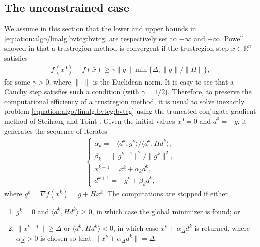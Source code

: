 \documentclass[letterpaper,10pt,english]{sphinxmanual}
\newcommand{\norm}[2][]{#1\lVert#2#1\rVert}
\newcommand{\set}[2][]{#1\{#2#1\}}
\newcommand{\inner}[2][]{#1\langle#2#1\rangle}
\def\R{\ensuremath{\mathds{R}}}
\begin{document}
\subsection{The unconstrained case}
\label{\detokenize{algo/linalg.bvtcg:the-unconstrained-case}}\label{\detokenize{algo/linalg.bvtcg:tcg-base}}
\sphinxAtStartPar
We assume in this section that the lower and upper bounds in \eqref{equation:algo/linalg.bvtcg:bvtcg} are
respectively set to \(-\infty\) and \(+\infty\). Powell showed in
 that a trust\sphinxhyphen{}region method is convergent if the trust\sphinxhyphen{}region step
\(\bar{x} \in \R^n\) satisfies
\begin{equation*}
\begin{split}f(x^0) - f(\bar{x}) \ge \gamma \norm{g} \min \set{\Delta, \norm{g} / \norm{H}},\end{split}
\end{equation*}
\sphinxAtStartPar
for some \(\gamma > 0\), where \(\norm{\cdot}\) is the Euclidean norm.
It is easy to see that a Cauchy step satisfies such a condition
(with \(\gamma = 1/2\)). Therefore, to preserve the computational
efficiency of a trust\sphinxhyphen{}region method, it is usual to solve inexactly problem
\eqref{equation:algo/linalg.bvtcg:bvtcg} using the truncated conjugate gradient method of Steihaug 
and Toint . Given the initial values \(x^0 = 0\) and
\(d^0 = -g\), it generates the sequence of iterates
\begin{equation*}
\begin{split}\left\{
\begin{array}{l}
    \alpha_k = -\inner{d^k, g^k} / \inner{d^k, Hd^k},\\
    \beta_k = \norm{g^{k + 1}}^2 / \norm{g^k}^2,\\
    x^{k + 1} = x^k + \alpha_k d^k,\\
    d^{k + 1} = -g^k + \beta_k d^k,
\end{array}
\right.\end{split}
\end{equation*}
\sphinxAtStartPar
where \(g^k = \nabla f(x^k) = g + Hx^k\). The computations are stopped if
either
\begin{enumerate}
%
\item {} 
\sphinxAtStartPar
\(g^k = 0\) and \(\inner{d^k, Hd^k} \ge 0\), in which case the
global minimizer is found; or

\item {} 
\sphinxAtStartPar
\(\norm{x^{k + 1}} \ge \Delta\) or \(\inner{d^k, Hd^k} < 0\), in
which case \(x^k + \alpha_{\Delta} d^k\) is returned, where
\(\alpha_{\Delta} > 0\) is chosen so that
\(\norm{x^k + \alpha_{\Delta} d^k} = \Delta\).

\end{enumerate}
\end{document}
